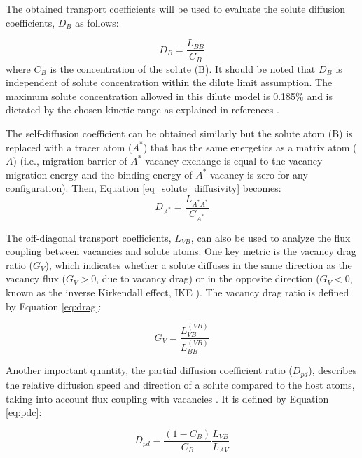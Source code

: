 \documentclass[preprint,12pt]{elsarticle}
\begin{document}
The obtained transport coefficients will be used to evaluate the solute diffusion coefficients, $D_B$ as follows:

\begin{equation}
\label{eq_solute_diffusivity}
    D_B = \frac{L_{BB}}{C_B}
\end{equation}
where $C_B$ is the concentration of the solute (B). It should be noted that $D_B$ is independent of solute concentration within the dilute limit assumption. The maximum solute concentration allowed in this dilute model is 0.185$\%$ and is dictated by the chosen kinetic range as explained in references \cite{messina_solute_2020,shousha_vacancy-mediated_2024,shousha2024first}.

The self-diffusion coefficient can be obtained similarly but the solute atom (B) is replaced with a tracer atom ($A^*$) that has the same energetics as a matrix atom ($A$) (i.e., migration barrier of $A^*$-vacancy exchange is equal to the vacancy migration energy and the binding energy of $A^*$-vacancy is zero for any configuration). Then, Equation \ref{eq_solute_diffusivity} becomes:
\begin{equation}
    D_{A^*} = \frac{L_{A^*A^*}}{C_{A^*}}
\end{equation}

The off-diagonal transport coefficients, $L_{VB}$, can also be used to analyze the flux coupling between vacancies and solute atoms. One key metric is the vacancy drag ratio ($G_V$), which indicates whether a solute diffuses in the same direction as the vacancy flux ($G_V > 0$, due to vacancy drag) or in the opposite direction ($G_V < 0$, known as the inverse Kirkendall effect, IKE \citep{marwick_segregation_1978}). The vacancy drag ratio is defined by Equation \ref{eq:drag}:

\begin{equation}
\label{eq:drag}
G_V = \frac{L_{VB}^{(VB)}}{L_{BB}^{(VB)}}
\end{equation}

Another important quantity, the partial diffusion coefficient ratio ($D_{pd}$), describes the relative diffusion speed and direction of a solute compared to the host atoms, taking into account flux coupling with vacancies \citep{messina_exact_2014,messina_solute_2020}. It is defined by Equation \ref{eq:pdc}:

\begin{equation}
\label{eq:pdc}
D_{pd} = \frac{(1-C_B)}{C_B} \frac{L_{VB}}{L_{AV}}
\end{equation}
\end{document}
